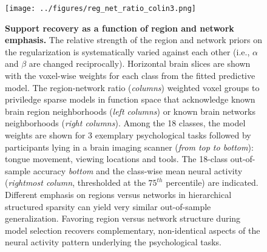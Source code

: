 \documentclass[runningheads,a4paper]{llncs}
\begin{document}
\begin{figure}
  \vspace{-0.6cm}
  \begin{centering}
    \texttt{[image: ../figures/reg\_net\_ratio\_colin3.png]}
    \vspace{-0.3cm}
    \caption{\textbf{Support recovery as a function of
    region and network emphasis.}
    The relative strength of the region and network priors
    on the regularization
    is systematically varied against each other
    (i.e., $\alpha$ and $\beta$ are changed reciprocally).
    Horizontal brain slices are shown with the voxel-wise weights for each class
    from the fitted predictive model.
    The region-network ratio (\textit{columns}) weighted voxel groups
    to priviledge sparse models in function space
    that acknowledge known brain region neighborhoods
    (\textit{left columns}) or
    known brain networks neighborhoods
    (\textit{right columns}).
    Among the 18 classes, the model weights are shown for 3 exemplary
    psychological
    tasks followed by participants lying in a brain imaging scanner
    (\textit{from top to bottom}): tongue movement,
    viewing locations and tools.
    The 18-class out-of-sample accuracy \textit{bottom} and
    the class-wise mean neural activity
    (\textit{rightmost column}, thresholded at the $75^{th}$ percentile)
    are indicated.
    Different emphasis on regions versus networks
    in hierarchical structured sparsity can
    yield very similar out-of-sample generalization.
    Favoring region versus network structure during model selection
    recovers complementary, non-identical aspects of
    the neural activity pattern underlying the psychological tasks.
    }
    \label{fig_regnetratio}
  \end{centering}
  \vspace{-0.6cm}
\end{figure}
\end{document}
